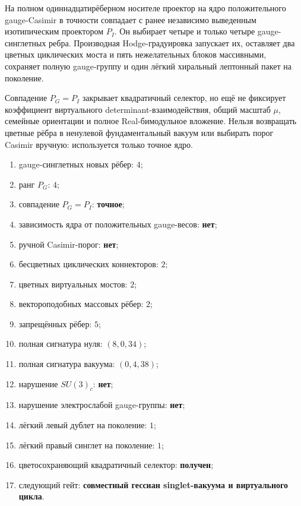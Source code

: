 \begin{theorem}
На полном одиннадцатирёберном носителе проектор на ядро положительного
gauge-Casimir в точности совпадает с ранее независимо выведенным
изотипическим проектором $P_I$. Он выбирает четыре и только четыре
gauge-синглетных ребра. Производная Hodge-градуировка запускает их,
оставляет два цветных циклических моста и пять нежелательных блоков
массивными, сохраняет полную gauge-группу и один лёгкий хиральный
лептонный пакет на поколение.
\end{theorem}

\begin{nogocriterion}
Совпадение $P_G=P_I$ закрывает квадратичный селектор, но ещё не фиксирует
коэффициент виртуального determinant-взаимодействия, общий масштаб $\mu$,
семейные ориентации и полное Real-бимодульное вложение. Нельзя возвращать
цветные рёбра в ненулевой фундаментальный вакуум или выбирать порог
Casimir вручную: используется только точное ядро.
\end{nogocriterion}

\begin{protocol}
\begin{enumerate}
 \item gauge-синглетных новых рёбер: \textbf{$4$};
 \item ранг $P_G$: \textbf{$4$};
 \item совпадение $P_G=P_I$: \textbf{точное};
 \item зависимость ядра от положительных gauge-весов: \textbf{нет};
 \item ручной Casimir-порог: \textbf{нет};
 \item бесцветных циклических коннекторов: \textbf{$2$};
 \item цветных виртуальных мостов: \textbf{$2$};
 \item вектороподобных массовых рёбер: \textbf{$2$};
 \item запрещённых рёбер: \textbf{$5$};
 \item полная сигнатура нуля: \textbf{$(8,0,34)$};
 \item полная сигнатура вакуума: \textbf{$(0,4,38)$};
 \item нарушение $SU(3)_c$: \textbf{нет};
 \item нарушение электрослабой gauge-группы: \textbf{нет};
 \item лёгкий левый дублет на поколение: \textbf{$1$};
 \item лёгкий правый синглет на поколение: \textbf{$1$};
 \item цветосохраняющий квадратичный селектор: \textbf{получен};
 \item следующий гейт: \textbf{совместный гессиан singlet-вакуума и
 виртуального цикла}.
\end{enumerate}
\end{protocol}

